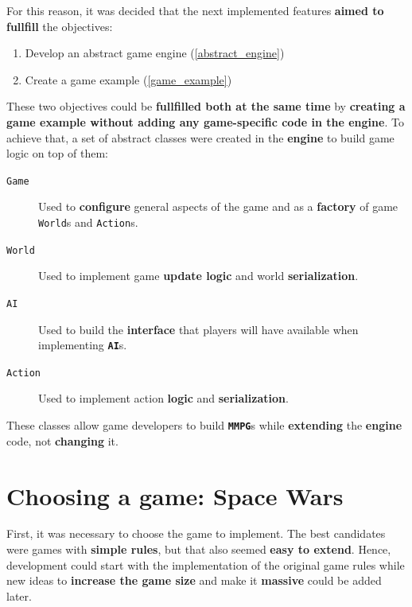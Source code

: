 \documentclass[a4paper,11pt,titlepage,abstract,numbers=noenddot,automark,mnsy,intlimits,rgb,dvipsnames]{report}
\begin{document}
For this reason, it was decided that the next implemented features \textbf{aimed to fullfill} the objectives:
\begin{enumerate}
\item
Develop an abstract game engine (\autoref{abstract_engine})
\item
Create a game example (\autoref{game_example})
\end{enumerate}
These two objectives could be \textbf{fullfilled both at the same time} by \textbf{creating a game example without adding any game-specific
code in the engine}. To achieve that, a set of abstract classes were created in the \textbf{engine} to build game logic on top of them:
\begin{description}
\item[\texttt{Game}]
Used to \textbf{configure} general aspects of the game and as a \textbf{factory} of game \texttt{World}s and \texttt{Action}s.
\item[\texttt{World}]
Used to implement game \textbf{update logic} and world \textbf{serialization}.
\item[\texttt{AI}]
Used to build the \textbf{interface} that players will have available when implementing \textbf{\texttt{AI}}s.
\item[\texttt{Action}]
Used to implement action \textbf{logic} and \textbf{serialization}.
\end{description}
These classes allow game developers to build \textbf{\texttt{MMPG}}s while \textbf{extending} the \textbf{engine} code, not \textbf{changing} it.
\section{Choosing a game: Space Wars}
First, it was necessary to choose the game to implement. The best candidates were games with \textbf{simple rules}, but that
also seemed \textbf{easy to extend}. Hence, development could start with the implementation of the original game rules while
new ideas to \textbf{increase the game size} and make it \textbf{massive} could be added later.
\end{document}
